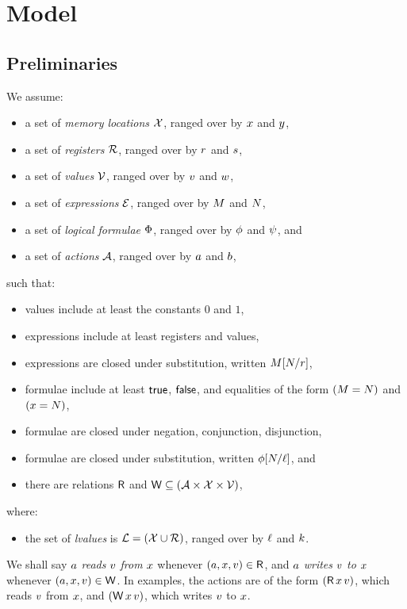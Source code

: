 \section{Model}

\subsection{Preliminaries}

We assume:
\begin{itemize}
\item a set of \emph{memory locations} $\mathcal{X}$, ranged over by
  $x$ and $y$,
\item a set of \emph{registers} $\mathcal{R}$, ranged over by
  $r$ and $s$,
\item a set of \emph{values} $\mathcal{V}$, ranged over by
  $v$ and $w$,
\item a set of \emph{expressions} $\mathcal{E}$, ranged over by
  $M$ and $N$,
\item a set of \emph{logical formulae} $\Phi$, ranged over by
  $\phi$ and $\psi$, and
\item a set of \emph{actions} $\mathcal{A}$, ranged over by $a$ and $b$,
\end{itemize}
such that:
\begin{itemize}
\item values include at least the constants $0$ and $1$,
\item expressions include at least registers and values,
\item expressions are closed under substitution, written $M[N/r]$,
\item formulae include at least $\mathsf{true}$, $\mathsf{false}$, and equalities of the form $(M=N)$ and $(x=N)$,
\item formulae are closed under negation, conjunction, disjunction,
\item formulae are closed under substitution, written $\phi[N/\ell]$, and
\item there are relations $\mathsf{R}$ and $\mathsf{W} \subseteq (\mathcal{A} \times \mathcal{X} \times \mathcal{V})$,
\end{itemize}
where:
\begin{itemize}
\item the set of \emph{lvalues} is $\mathcal{L}=(\mathcal{X}\cup\mathcal{R})$, ranged over by $\ell$ and $k$.
\end{itemize}
We shall say $a$ \emph{reads} $v$ \emph{from} $x$ whenever
$(a,x,v) \in \mathsf{R}$, and
$a$ \emph{writes} $v$ \emph{to} $x$ whenever
$(a,x,v) \in \mathsf{W}$.
In examples, the actions are of the form $(\mathsf{R}\,x\,v)$, which reads $v$ from $x$,
and $(\mathsf{W}\,x\,v)$, which writes $v$ to $x$.

